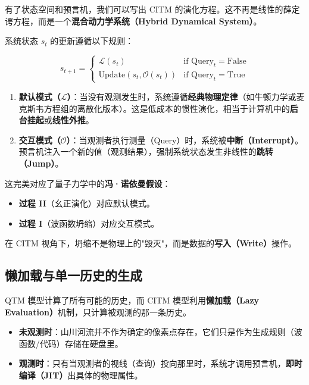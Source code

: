 有了状态空间和预言机，我们可以写出 CITM 的演化方程。这不再是线性的薛定谔方程，而是一个\textbf{混合动力学系统（Hybrid Dynamical System）}。

系统状态 $s_t$ 的更新遵循以下规则：

\begin{equation}
s_{t+1} = 
\begin{cases} 
\mathcal{L}(s_t) & \text{if } \text{Query}_t = \text{False} \\
\text{Update}(s_t, \mathcal{O}(s_t)) & \text{if } \text{Query}_t = \text{True} 
\end{cases}
\end{equation}

\begin{enumerate}
\item \textbf{默认模式（$\mathcal{L}$）}：当没有观测发生时，系统遵循\textbf{经典物理定律}（如牛顿力学或麦克斯韦方程组的离散化版本）。这是低成本的惯性演化，相当于计算机中的\textbf{后台挂起}或\textbf{线性外推}。

\item \textbf{交互模式（$\mathcal{O}$）}：当观测者执行测量（Query）时，系统被\textbf{中断（Interrupt）}。预言机注入一个新的值（观测结果），强制系统状态发生非线性的\textbf{跳转（Jump）}。
\end{enumerate}

这完美对应了量子力学中的\textbf{冯·诺依曼假设}：

\begin{itemize}
\item \textbf{过程 II}（幺正演化）对应默认模式。

\item \textbf{过程 I}（波函数坍缩）对应交互模式。
\end{itemize}

在 CITM 视角下，坍缩不是物理上的"毁灭"，而是数据的\textbf{写入（Write）}操作。

\subsection{懒加载与单一历史的生成}

QTM 模型计算了所有可能的历史，而 CITM 模型利用\textbf{懒加载（Lazy Evaluation）}机制，只计算被观测的那一条历史。

\begin{itemize}
\item \textbf{未观测时}：山川河流并不作为确定的像素点存在，它们只是作为生成规则（波函数/代码）存储在硬盘里。

\item \textbf{观测时}：只有当观测者的视线（查询）投向那里时，系统才调用预言机，\textbf{即时编译（JIT）}出具体的物理属性。
\end{itemize}


